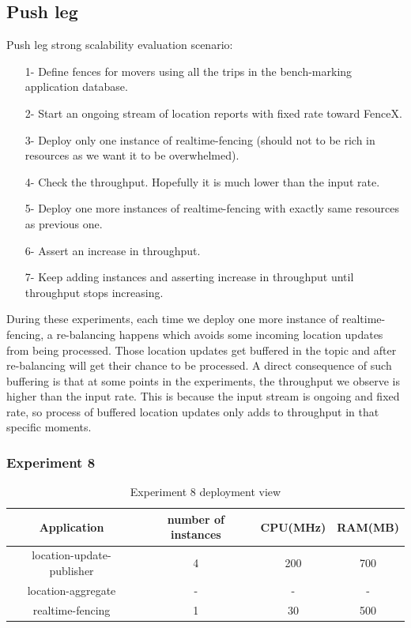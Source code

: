 \documentclass[a4]{report}
\begin{document}
    \subsection{Push leg}
    Push leg strong scalability evaluation scenario:
    \begin{itemize}
        \item[1-] Define fences for movers using all the trips in the bench-marking application database.
        \item[2-] Start an ongoing stream of location reports with fixed rate toward FenceX.
        \item[3-] Deploy only one instance of realtime-fencing (should not to be rich in resources as we want it to
        be overwhelmed).
        \item[4-] Check the throughput. Hopefully it is much lower than the input rate.
        \item[5-] Deploy one more instances of realtime-fencing with exactly same resources as previous one.
        \item[6-] Assert an increase in throughput.
        \item[7-] Keep adding instances and asserting increase in throughput until throughput stops increasing.
    \end{itemize}

    During these experiments, each time we deploy one more instance of realtime-fencing, a re-balancing happens which
    avoids some incoming location updates from being processed.
    Those location updates get buffered in the topic and after re-balancing will get their chance to be processed.
    A direct consequence of such buffering is that at some points in the experiments, the throughput we observe is
    higher than the input rate.
    This is because the input stream is ongoing and fixed rate, so process of buffered location updates only adds to
    throughput in that specific moments.

    \clearpage

    \subsubsection{Experiment 8}
    \begin{table}[h!]
        \centering
        \begin{tabular}{|c|c|c|c|}
            \hline
            Application               & number of instances & CPU(MHz) & RAM(MB) \\
            \hline
            location-update-publisher & 4                   & 200      & 700     \\
            location-aggregate        & -                   & -        & -       \\
            realtime-fencing          & 1                   & 30       & 500     \\
            \hline
        \end{tabular}
        \caption{Experiment 8 deployment view}
        \label{table:ex8-dv}
    \end{table}
\end{document}
